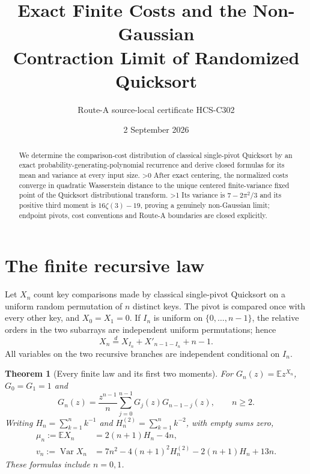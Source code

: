 \documentclass[10pt]{article}
\title{Exact Finite Costs and the Non-Gaussian\\
Contraction Limit of Randomized Quicksort}
\author{Route-A source-local certificate HCS-C302}
\date{2 September 2026}
\providecommand{\CRevisionRound}{2}
\newtheorem{theorem}{Theorem}
\newcommand{\E}{\mathbb E}
\newcommand{\Var}{\operatorname{Var}}
\begin{document}
\maketitle

\begin{abstract}
We determine the comparison-cost distribution of classical single-pivot
Quicksort by an exact probability-generating-polynomial recurrence and derive
closed formulas for its mean and variance at every input size.
\ifnum\CRevisionRound>0
After exact centering, the normalized costs converge in quadratic Wasserstein
distance to the unique centered finite-variance fixed point of the Quicksort
distributional transform.
\fi
\ifnum\CRevisionRound>1
Its variance is $7-2\pi^2/3$ and its positive third moment is
$16\zeta(3)-19$, proving a genuinely non-Gaussian limit; endpoint pivots,
cost conventions and Route-A boundaries are closed explicitly.
\fi
\end{abstract}

\section{The finite recursive law}
Let $X_n$ count key comparisons made by classical single-pivot Quicksort on a
uniform random permutation of $n$ distinct keys.  The pivot is compared once
with every other key, and $X_0=X_1=0$.  If $I_n$ is uniform on
$\{0,\ldots,n-1\}$, the relative orders in the two subarrays are independent
uniform permutations; hence
\begin{equation}\label{eq:rec}
 X_n\mathrel{\mathop=\limits^d}X_{I_n}+X'_{n-1-I_n}+n-1.
\end{equation}
All variables on the two recursive branches are independent conditional on
$I_n$.

\begin{theorem}[Every finite law and its first two moments]\label{thm:finite}
For $G_n(z)=\E z^{X_n}$, $G_0=G_1=1$ and
\begin{equation}\label{eq:pgf}
 G_n(z)=\frac{z^{n-1}}n\sum_{j=0}^{n-1}G_j(z)G_{n-1-j}(z),\qquad n\ge2.
\end{equation}
Writing $H_n=\sum_{k=1}^n k^{-1}$ and
$H_n^{(2)}=\sum_{k=1}^n k^{-2}$, with empty sums zero,
\begin{align}
 \mu_n:=\E X_n&=2(n+1)H_n-4n,\label{eq:mean}\\
 v_n:=\Var X_n&=7n^2-4(n+1)^2H_n^{(2)}
                 -2(n+1)H_n+13n.\label{eq:variance}
\end{align}
These formulas include $n=0,1$.
\end{theorem}
\end{document}
